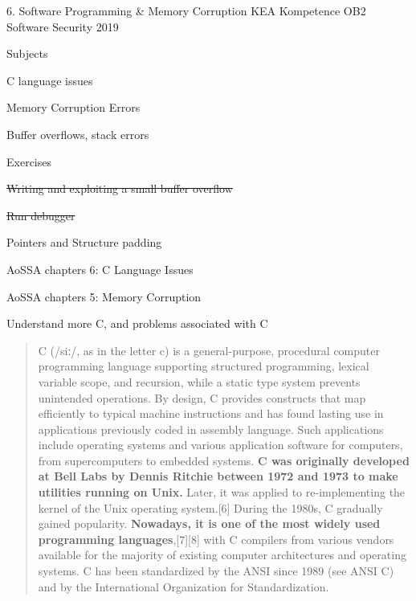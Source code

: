 \documentclass[Screen16to9,17pt]{foils}
\begin{document}
\mytitlepage
{6. Software Programming \& Memory Corruption}
{KEA Kompetence OB2 Software Security 2019}


\begin{list1}
\item Subjects
\begin{list2}
\item C language issues
\item Memory Corruption Errors
\item Buffer overflows, stack errors
\end{list2}
\item Exercises
\begin{list2}
\item \sout{Writing and exploiting a small buffer overflow}
\item \sout{Run debugger}
\item Pointers and Structure padding
\end{list2}
\end{list1}


\begin{list1}
\item AoSSA chapters 6: C Language Issues
\item AoSSA chapters 5: Memory Corruption
\end{list1}



\begin{list1}
\item Understand more C, and problems associated with C
\end{list1}



\begin{quote}\small
C (/siː/, as in the letter c) is a general-purpose, procedural computer programming language supporting structured programming, lexical variable scope, and recursion, while a static type system prevents unintended operations. By design, C provides constructs that map efficiently to typical machine instructions and has found lasting use in applications previously coded in assembly language. Such applications include operating systems and various application software for computers, from supercomputers to embedded systems.
{\bf
C was originally developed at Bell Labs by Dennis Ritchie between 1972 and 1973 to make utilities running on Unix.} Later, it was applied to re-implementing the kernel of the Unix operating system.[6] During the 1980s, C gradually gained popularity. {\bf Nowadays, it is one of the most widely used programming languages},[7][8] with C compilers from various vendors available for the majority of existing computer architectures and operating systems. C has been standardized by the ANSI since 1989 (see ANSI C) and by the International Organization for Standardization.
\end{quote}
\end{document}
